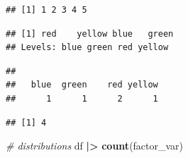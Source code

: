 \documentclass[
  12pt,
  oneside]{book}
\newenvironment{Shaded}{\begin{snugshade}}{\end{snugshade}}
\newcommand{\CommentTok}[1]{\textcolor[rgb]{0.56,0.35,0.01}{\textit{#1}}}
\newcommand{\FunctionTok}[1]{\textcolor[rgb]{0.13,0.29,0.53}{\textbf{#1}}}
\newcommand{\NormalTok}[1]{#1}
\newcommand{\SpecialCharTok}[1]{\textcolor[rgb]{0.81,0.36,0.00}{\textbf{#1}}}
\theoremstyle{definition}
\theoremstyle{definition}
\theoremstyle{definition}
\theoremstyle{definition}
\theoremstyle{remark}
\begin{document}
\begin{Shaded}
\end{Shaded}

\begin{verbatim}
## [1] 1 2 3 4 5
\end{verbatim}

\begin{Shaded}
\end{Shaded}

\begin{verbatim}
## [1] red    yellow blue   green 
## Levels: blue green red yellow
\end{verbatim}

\begin{Shaded}
\end{Shaded}

\begin{verbatim}
## 
##   blue  green    red yellow 
##      1      1      2      1
\end{verbatim}

\begin{Shaded}
\end{Shaded}

\begin{verbatim}
## [1] 4
\end{verbatim}

\begin{Shaded}
\begin{Highlighting}[]
\CommentTok{\# distributions}
\NormalTok{df }\SpecialCharTok{|\textgreater{}} \FunctionTok{count}\NormalTok{(factor\_var)}
\end{Highlighting}
\end{Shaded}
\end{document}
